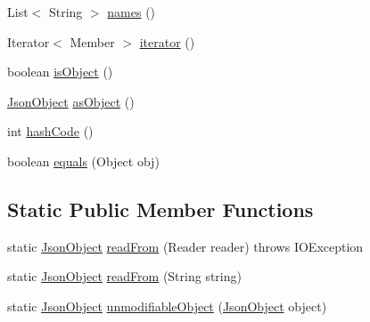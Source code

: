 \begin{DoxyCompactItemize}
\item 
List$<$ String $>$ \hyperlink{classcom_1_1ingeniigroup_1_1stratux_1_1_tools_1_1_json_micro_1_1_json_object_a70753ed3f8f6c138e16acf76874aff52}{names} ()
\item 
Iterator$<$ Member $>$ \hyperlink{classcom_1_1ingeniigroup_1_1stratux_1_1_tools_1_1_json_micro_1_1_json_object_ae4ccfbc940cc5bac61845b666d0b4885}{iterator} ()
\item 
boolean \hyperlink{classcom_1_1ingeniigroup_1_1stratux_1_1_tools_1_1_json_micro_1_1_json_object_a13476b3c64ca6e7fcefbf7106bfe32d9}{is\+Object} ()
\item 
\hyperlink{classcom_1_1ingeniigroup_1_1stratux_1_1_tools_1_1_json_micro_1_1_json_object}{Json\+Object} \hyperlink{classcom_1_1ingeniigroup_1_1stratux_1_1_tools_1_1_json_micro_1_1_json_object_a3c2d9aa3dc452ebd9116525e121ec255}{as\+Object} ()
\item 
int \hyperlink{classcom_1_1ingeniigroup_1_1stratux_1_1_tools_1_1_json_micro_1_1_json_object_ad92e52f785bae6bf219e8e1d65de6228}{hash\+Code} ()
\item 
boolean \hyperlink{classcom_1_1ingeniigroup_1_1stratux_1_1_tools_1_1_json_micro_1_1_json_object_a4d86dae6ae433bac3498be5d0b22b250}{equals} (Object obj)
\end{DoxyCompactItemize}
\subsection*{Static Public Member Functions}
\begin{DoxyCompactItemize}
\item 
static \hyperlink{classcom_1_1ingeniigroup_1_1stratux_1_1_tools_1_1_json_micro_1_1_json_object}{Json\+Object} \hyperlink{classcom_1_1ingeniigroup_1_1stratux_1_1_tools_1_1_json_micro_1_1_json_object_a9e8230a755b00eeb6def0d2980471172}{read\+From} (Reader reader)  throws I\+O\+Exception 
\item 
static \hyperlink{classcom_1_1ingeniigroup_1_1stratux_1_1_tools_1_1_json_micro_1_1_json_object}{Json\+Object} \hyperlink{classcom_1_1ingeniigroup_1_1stratux_1_1_tools_1_1_json_micro_1_1_json_object_a613f0a64c66a7d0a5e5f6705fef9afc4}{read\+From} (String string)
\item 
static \hyperlink{classcom_1_1ingeniigroup_1_1stratux_1_1_tools_1_1_json_micro_1_1_json_object}{Json\+Object} \hyperlink{classcom_1_1ingeniigroup_1_1stratux_1_1_tools_1_1_json_micro_1_1_json_object_a9b30873520a3eece459ae927864408c3}{unmodifiable\+Object} (\hyperlink{classcom_1_1ingeniigroup_1_1stratux_1_1_tools_1_1_json_micro_1_1_json_object}{Json\+Object} object)
\end{DoxyCompactItemize}
